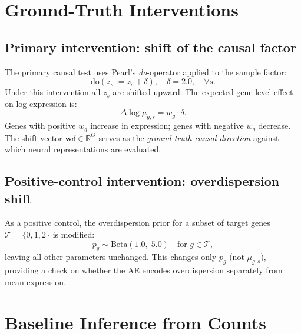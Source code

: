 \documentclass[11pt,a4paper]{article}
\newcommand{\R}{\mathbb{R}}
\newcommand{\Beta}{\mathrm{Beta}}
\newcommand{\doop}{\mathrm{do}}
\theoremstyle{definition}
\begin{document}
\section{Ground-Truth Interventions}
\label{sec:interventions}

\subsection{Primary intervention: shift of the causal factor}

The primary causal test uses Pearl's \emph{do}-operator applied to the
sample factor:
\begin{equation}
  \doop(z_s := z_s + \delta), \quad \delta = 2.0, \quad \forall s.
  \label{eq:do_z}
\end{equation}
Under this intervention all $z_s$ are shifted upward.  The expected
gene-level effect on log-expression is:
\begin{equation}
  \Delta \log \mu_{g,s} = w_g \cdot \delta.
  \label{eq:logmu_shift}
\end{equation}
Genes with positive $w_g$ increase in expression; genes with negative
$w_g$ decrease.  The shift vector $\bm{w}\delta \in \R^G$ serves as the
\emph{ground-truth causal direction} against which neural representations
are evaluated.

\subsection{Positive-control intervention: overdispersion shift}

As a positive control, the overdispersion prior for a subset of target
genes $\mathcal{T} = \{0,1,2\}$ is modified:
\begin{equation}
  p_g \sim \Beta(1.0,\; 5.0) \quad \text{for } g \in \mathcal{T},
\end{equation}
leaving all other parameters unchanged. This changes only $p_g$ (not
$\mu_{g,s}$), providing a check on whether the AE encodes
overdispersion separately from mean expression.

\section{Baseline Inference from Counts}
\label{sec:inference}
\end{document}
